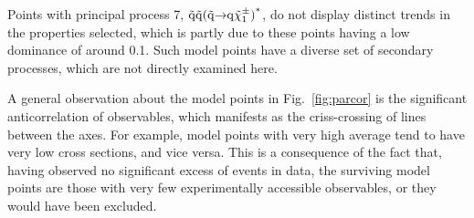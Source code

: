 Points with principal process 7, $\tilde{\rm q}\tilde{\rm q}(\tilde{\rm q} \hspace{-1mm}\rightarrow \hspace{-1mm}{\rm q}\tilde{\chi}^{\pm}_{1})^{\text{*}}$, do not display distinct trends in the
properties selected, which is partly due to these points having a
low dominance of around 0.1. Such model points have a diverse set of
secondary processes, which are not directly examined here.

A general observation about the model points in Fig.~\ref{fig:parcor}
is the significant anticorrelation of observables, which
manifests as the criss-crossing of lines between the axes. For example,
model points with very high average \MET{} tend to have very low cross sections,
and vice versa. This is a consequence of the fact that, having observed no significant excess of events in data,
the surviving model points are those with very few experimentally accessible 
observables, or they would have been excluded.

